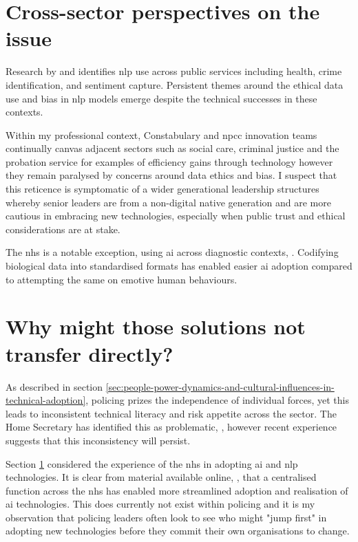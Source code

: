 \documentclass[12pt,a4paper,oneside]{report}
\begin{document}
\section{Cross-sector perspectives on the issue} 
\label{sec:cross-sector-perspectives-on-the-issue}
Research by \citet{dunleavy2023data} and \citet{ngai2025natural} identifies \gls{nlp} use across public services including health, crime identification, and sentiment capture.  Persistent themes  around the ethical data use and bias in \gls{nlp} models emerge despite the technical successes in these contexts.

Within my professional context, Constabulary and \gls{npcc} innovation teams continually canvas adjacent sectors such as social care, criminal justice and the probation service for examples of efficiency gains through technology however they remain paralysed by concerns around data ethics and bias.  I suspect that this reticence is symptomatic of a wider generational leadership structures whereby senior leaders are from a non-digital native generation and are more cautious in embracing new technologies, especially when public trust and ethical considerations are at stake.

The \gls{nhs} is a notable exception, using \gls{ai} across diagnostic contexts, \citep{ai2023nhs}.  Codifying biological data into standardised formats has enabled easier \gls{ai} adoption compared to attempting the same on emotive human behaviours.

\section{Why might those solutions not transfer directly?}
\label{sec:why-might-those-solutions-not-transfer-directly}
As described in section \ref{sec:people-power-dynamics-and-cultural-influences-in-technical-adoption}, policing prizes the independence of individual forces, yet this leads to inconsistent technical literacy and risk appetite across the sector.  The Home Secretary has identified this as problematic, \citep{homeoffice2024reform}, however recent experience suggests that this inconsistency will persist.

Section \ref{sec:cross-sector-perspectives-on-the-issue} considered the experience of the \gls{nhs} in adopting \gls{ai} and \gls{nlp} technologies.  It is clear from material available online, \citep{aiknowledge2023nhs}, that a centralised function across the \gls{nhs} has enabled more streamlined adoption and realisation of \gls{ai} technologies.  This does currently not exist within policing and it is my observation that policing leaders often look to see who might "jump first" in adopting new technologies before they commit their own organisations to change.  
\end{document}
